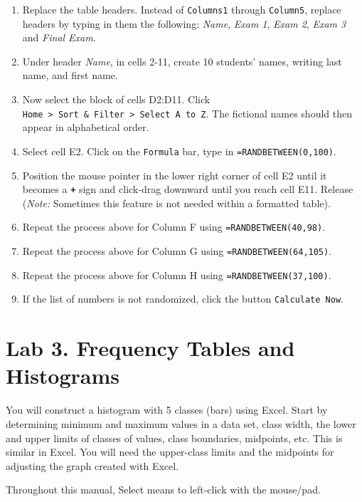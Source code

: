 \documentclass[
]{book}
\providecommand{\tightlist}{%
  \setlength{\itemsep}{0pt}\setlength{\parskip}{0pt}}
\begin{document}
\begin{enumerate}
\def\labelenumi{\arabic{enumi}.}
\setcounter{enumi}{3}
\tightlist
\item
  Replace the table headers. Instead of \texttt{Columns1} through \texttt{Column5}, replace headers by typing in them the following: \emph{Name}, \emph{Exam 1}, \emph{Exam 2}, \emph{Exam 3} and \emph{Final Exam}.
\item
  Under header \emph{Name}, in cells 2-11, create 10 students' names, writing last name, and first name.
\item
  Now select the block of cells D2:D11. Click \texttt{Home\ \textgreater{}\ Sort\ \&\ Filter\ \textgreater{}\ Select\ A\ to\ Z}. The fictional names should then appear in alphabetical order.
\item
  Select cell E2. Click on the \texttt{Formula} bar, type in \texttt{=RANDBETWEEN(0,100)}.
\item
  Position the mouse pointer in the lower right corner of cell E2 until it becomes a \textbf{\texttt{+}} sign and click-drag downward until you reach cell E11. Release (\emph{Note:} Sometimes this feature is not needed within a formatted table).
\item
  Repeat the process above for Column F using \texttt{=RANDBETWEEN(40,98)}.
\item
  Repeat the process above for Column G using \texttt{=RANDBETWEEN(64,105)}.
\item
  Repeat the process above for Column H using \texttt{=RANDBETWEEN(37,100)}.
\item
  If the list of numbers is not randomized, click the button \texttt{Calculate\ Now}.
\end{enumerate}

\hypertarget{lab-3.-frequency-tables-and-histograms}{%
\chapter{Lab 3. Frequency Tables and Histograms}\label{lab-3.-frequency-tables-and-histograms}}

You will construct a histogram with 5 classes (bars) using Excel. Start by determining minimum and maximum values in a data set, class width, the lower and upper limits of classes of values, class boundaries, midpoints, etc. This is similar in Excel. You will need the upper-class limits and the midpoints for adjusting the graph created with Excel.

Throughout this manual, Select means to left-click with the mouse/pad.
\end{document}
